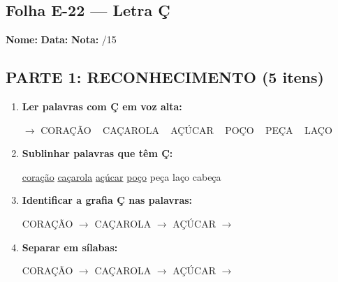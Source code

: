 \subsection{Folha E-22 --- Letra Ç}
\begin{exercicio}



\noindent\textbf{Nome:} \underline{\hspace{3.2cm}} \quad \textbf{Data:} \underline{\hspace{1.6cm}} \quad \textbf{Nota:} \underline{\hspace{0.9cm}}/15


\subsection*{PARTE 1: RECONHECIMENTO (5 itens)}

\begin{enumerate}

  \item \textbf{Ler palavras com Ç em voz alta:}
  \begin{center}
  $\rightarrow$ CORAÇÃO ~ CAÇAROLA ~ AÇÚCAR ~ POÇO ~ PEÇA ~ LAÇO
  \end{center}

  \item \textbf{Sublinhar palavras que têm Ç:}

\begin{center}
  \uline{coração} \quad \uline{caçarola} \quad \uline{açúcar} \quad \uline{poço} \quad peça \quad laço \quad cabeça
\end{center}

  \item \textbf{Identificar a grafia Ç nas palavras:}
  \begin{center}
  CORAÇÃO $\rightarrow$ \underline{\hspace{1cm}} \quad CAÇAROLA $\rightarrow$ \underline{\hspace{1cm}} \quad AÇÚCAR $\rightarrow$ \underline{\hspace{1cm}}
  \end{center}

  \item \textbf{Separar em sílabas:}
  \begin{center}
  CORAÇÃO $\rightarrow$ \underline{\hspace{1.2cm}} \quad CAÇAROLA $\rightarrow$ \underline{\hspace{1.2cm}} \quad AÇÚCAR $\rightarrow$ \underline{\hspace{1.2cm}}
  \end{center}


\end{enumerate}
\end{exercicio}
